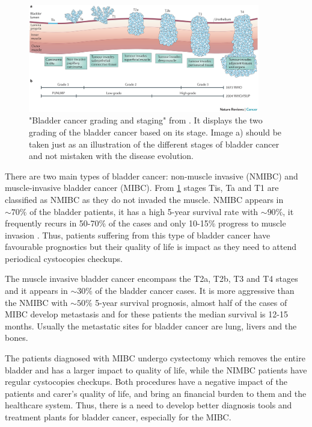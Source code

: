 \begin{figure}[!htb]    
    \centering
\includegraphics[width=0.9\textwidth,height=0.9\textheight,keepaspectratio]{Sections/Lit_review/Resources/bladder_cancer_grading.jpg}
    \caption{"Bladder cancer grading and staging" from \cite{Knowles2015-mu}. It displays the two grading of the bladder cancer based on its stage. Image a) should be taken just as an illustration of the different stages of bladder cancer and not mistaken with the disease evolution. }
    \label{fig:lit:bladder_cancer_stages}
\end{figure}


There are two main types of bladder cancer: non-muscle invasive (NMIBC) and muscle-invasive bladder cancer (MIBC). From \cref{fig:lit:bladder_cancer_stages} stages Tis, Ta and T1 are classified as NMIBC as they do not invaded the muscle. NMIBC appears in $\sim70\%$ of the bladder patients, it has a high 5-year survival rate with $\sim90\%$, it frequently recurs in 50-70\% of the cases and only 10-15\% progress to muscle invasion \cite{Knowles2015-mu}. Thus, patients suffering from this type of bladder cancer have favourable prognostics but their quality of life is impact as they need to attend periodical cystocopies checkups.

The muscle invasive bladder cancer encompass the T2a, T2b, T3 and T4 stages and it appears in $\sim30\%$ of the bladder cancer cases. It is more aggressive than the NMIBC with $\sim50\%$ 5-year survival prognosis, almost half of the cases of MIBC develop metastasis and for these patients the median survival is 12-15 months\cite{Knowles2015-mu}. Usually the metastatic sites for bladder cancer are lung, livers and the bones.

The patients diagnosed with MIBC undergo cystectomy which removes the entire bladder and has a larger impact to quality of life, while the NIMBC patients have regular cystocopies checkups. Both procedures have a negative impact of the patients and carer's quality of life, and bring an financial burden to them and the healthcare system. Thus, there is a need to develop better diagnosis tools and treatment plants for bladder cancer, especially for the MIBC.

